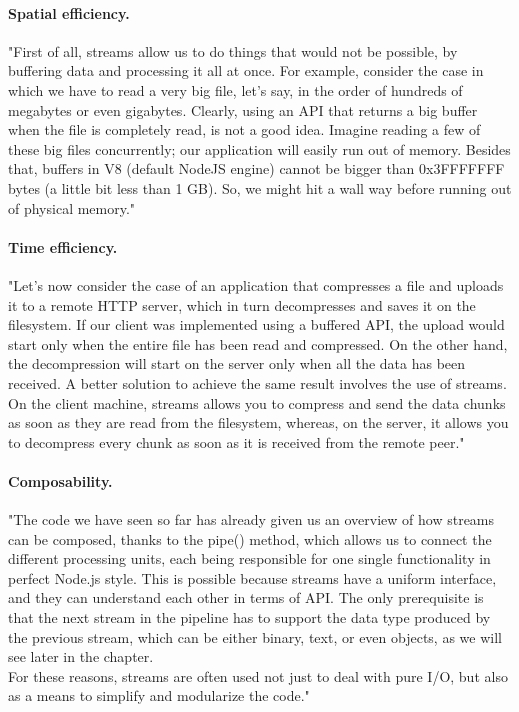 \documentclass{llncs}
\begin{document}
\paragraph{Spatial efficiency.}
"First of all, streams allow us to do things that would not be possible, by buffering data and processing it all at once. For example, consider the case in which we have to read a very big file, let's say, in the order of hundreds of megabytes or even gigabytes. 
Clearly, using an API that returns a big buffer when the file is completely read, is not a good idea.
Imagine reading a few of these big files concurrently; our application will easily run out of memory. Besides that, buffers in V8 (default NodeJS engine) cannot be bigger than 0x3FFFFFFF bytes (a little bit less than 1 GB). 
So, we might hit a wall way before running out of physical memory." \cite{nodejsbook}

\paragraph{Time efficiency.}
"Let's now consider the case of an application that compresses a file and uploads it to a remote HTTP server, which in turn decompresses and saves it on the filesystem.
If our client was implemented using a buffered API, the upload would start only when the entire file has been read and compressed. On the other hand, the decompression will start on the server only when all the data has been received. 
A better solution to achieve the same result involves the use of streams. 
On the client machine, streams allows you to compress and send the data chunks as soon as they are read from the filesystem, whereas, on the server, it allows you to decompress every chunk as soon as it is received from the remote peer."\cite{nodejsbook}

\paragraph{Composability.}
"The code we have seen so far has already given us an overview of how streams can be composed, thanks to the pipe() method, which allows us to connect the different processing units, each being responsible for one single functionality in perfect Node.js style. 
This is possible because streams have a uniform interface, and they can understand each other in terms of API. The only prerequisite is that the next stream in the pipeline has to support the data type produced by the previous stream, which can be either binary, text, or even objects, as we will see later in the chapter.\\
For these reasons, streams are often used not just to deal with pure I/O, but also as a means to simplify and modularize the code."\cite{nodejsbook}
\end{document}

